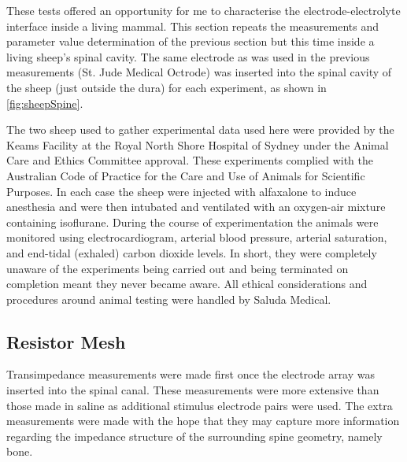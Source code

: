   These tests offered an opportunity for me to characterise the electrode-electrolyte interface inside a living mammal.
  This section repeats the measurements and parameter value determination of the previous section but this time inside a living sheep's spinal cavity.
  The same electrode as was used in the previous measurements (St. Jude Medical Octrode) was inserted into the spinal cavity of the sheep (just outside the dura) for each experiment, as shown in \cref{fig:sheepSpine}.

  The two sheep used to gather experimental data used here were provided by the Keams Facility at the Royal North Shore Hospital of Sydney under the Animal Care and Ethics Committee approval.
  These experiments complied with the Australian Code of Practice for the Care and Use of Animals for Scientific Purposes.
  In each case the sheep were injected with alfaxalone to induce anesthesia and were then intubated and ventilated with an oxygen-air mixture containing isoflurane.
  During the course of experimentation the animals were monitored using electrocardiogram, arterial blood pressure, arterial saturation, and end-tidal (exhaled) carbon dioxide levels.
  In short, they were completely unaware of the experiments being carried out and being terminated on completion meant they never became aware.
  All ethical considerations and procedures around animal testing were handled by Saluda Medical.

  \subsection{Resistor Mesh}
  Transimpedance measurements were made first once the electrode array was inserted into the spinal canal.
  These measurements were more extensive than those made in saline as additional stimulus electrode pairs were used.
  The extra measurements were made with the hope that they may capture more information regarding the impedance structure of the surrounding spine geometry, namely bone.

